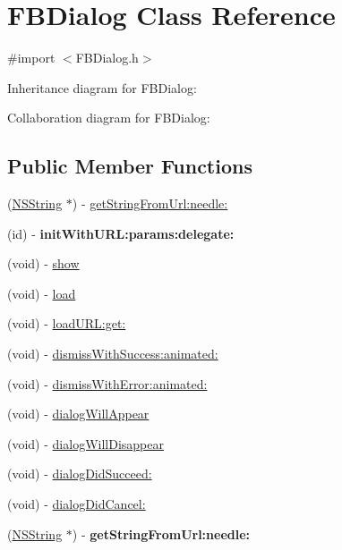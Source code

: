 \hypertarget{interface_f_b_dialog}{
\section{\-F\-B\-Dialog \-Class \-Reference}
\label{interface_f_b_dialog}
}


{\ttfamily \#import $<$\-F\-B\-Dialog.\-h$>$}



\-Inheritance diagram for \-F\-B\-Dialog\-:


\-Collaboration diagram for \-F\-B\-Dialog\-:
\subsection*{\-Public \-Member \-Functions}
\begin{DoxyCompactItemize}
\item 
(\hyperlink{class_n_s_string}{\-N\-S\-String} $\ast$) -\/ \hyperlink{interface_f_b_dialog_a30c3df8ccf10cc5735d1f7d2e992f984}{get\-String\-From\-Url\-:needle\-:}
\item 
\hypertarget{interface_f_b_dialog_aaf959b0fcd619b6b05e459983172b10c}{
(id) -\/ {\bfseries init\-With\-U\-R\-L\-:params\-:delegate\-:}}
\label{interface_f_b_dialog_aaf959b0fcd619b6b05e459983172b10c}

\item 
(void) -\/ \hyperlink{interface_f_b_dialog_a657a94d26c8dd3dfbe60b64c6bcbf411}{show}
\item 
(void) -\/ \hyperlink{interface_f_b_dialog_a41ca6458674d1701e6e1d143d5aeb972}{load}
\item 
(void) -\/ \hyperlink{interface_f_b_dialog_a3b32355179377b16579a427e221929f4}{load\-U\-R\-L\-:get\-:}
\item 
(void) -\/ \hyperlink{interface_f_b_dialog_a29fdcc8f0a52e8008b298743d5f7df49}{dismiss\-With\-Success\-:animated\-:}
\item 
(void) -\/ \hyperlink{interface_f_b_dialog_ab28580963cd61978da74492dabce054b}{dismiss\-With\-Error\-:animated\-:}
\item 
(void) -\/ \hyperlink{interface_f_b_dialog_ad0bfcbe959e7334d076079ce3288142d}{dialog\-Will\-Appear}
\item 
(void) -\/ \hyperlink{interface_f_b_dialog_a0aaf0151353b93b543525601f9d41a83}{dialog\-Will\-Disappear}
\item 
(void) -\/ \hyperlink{interface_f_b_dialog_a038587c0962d2dbda704f151d45eb6d3}{dialog\-Did\-Succeed\-:}
\item 
(void) -\/ \hyperlink{interface_f_b_dialog_a91e729bd79578cb130cf5256e1fb2b8e}{dialog\-Did\-Cancel\-:}
\item 
\hypertarget{interface_f_b_dialog_a30c3df8ccf10cc5735d1f7d2e992f984}{
(\hyperlink{class_n_s_string}{\-N\-S\-String} $\ast$) -\/ {\bfseries get\-String\-From\-Url\-:needle\-:}}
\label{interface_f_b_dialog_a30c3df8ccf10cc5735d1f7d2e992f984}


\end{DoxyCompactItemize}
